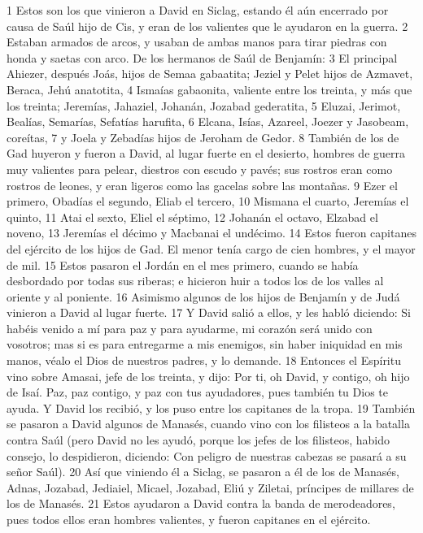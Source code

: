 1 Estos son los que vinieron a David en Siclag, estando él aún encerrado por causa de Saúl hijo de Cis, y eran de los valientes que le ayudaron en la guerra.
2 Estaban armados de arcos, y usaban de ambas manos para tirar piedras con honda y saetas con arco. De los hermanos de Saúl de Benjamín:
3 El principal Ahiezer, después Joás, hijos de Semaa gabaatita; Jeziel y Pelet hijos de Azmavet, Beraca, Jehú anatotita,
4 Ismaías gabaonita, valiente entre los treinta, y más que los treinta; Jeremías, Jahaziel, Johanán, Jozabad gederatita,
5 Eluzai, Jerimot, Bealías, Semarías, Sefatías harufita,
6 Elcana, Isías, Azareel, Joezer y Jasobeam, coreítas,
7 y Joela y Zebadías hijos de Jeroham de Gedor.
8 También de los de Gad huyeron y fueron a David, al lugar fuerte en el desierto, hombres de guerra muy valientes para pelear, diestros con escudo y pavés; sus rostros eran como rostros de leones, y eran ligeros como las gacelas sobre las montañas.
9 Ezer el primero, Obadías el segundo, Eliab el tercero,
10 Mismana el cuarto, Jeremías el quinto,
11 Atai el sexto, Eliel el séptimo,
12 Johanán el octavo, Elzabad el noveno,
13 Jeremías el décimo y Macbanai el undécimo.
14 Estos fueron capitanes del ejército de los hijos de Gad. El menor tenía cargo de cien hombres, y el mayor de mil.
15 Estos pasaron el Jordán en el mes primero, cuando se había desbordado por todas sus riberas; e hicieron huir a todos los de los valles al oriente y al poniente.
16 Asimismo algunos de los hijos de Benjamín y de Judá vinieron a David al lugar fuerte.
17 Y David salió a ellos, y les habló diciendo: Si habéis venido a mí para paz y para ayudarme, mi corazón será unido con vosotros; mas si es para entregarme a mis enemigos, sin haber iniquidad en mis manos, véalo el Dios de nuestros padres, y lo demande.
18 Entonces el Espíritu vino sobre Amasai, jefe de los treinta, y dijo: Por ti, oh David, y contigo, oh hijo de Isaí. Paz, paz contigo, y paz con tus ayudadores, pues también tu Dios te ayuda. Y David los recibió, y los puso entre los capitanes de la tropa.
19 También se pasaron a David algunos de Manasés, cuando vino con los filisteos a la batalla contra Saúl (pero David no les ayudó, porque los jefes de los filisteos, habido consejo, lo despidieron, diciendo: Con peligro de nuestras cabezas se pasará a su señor Saúl).
20 Así que viniendo él a Siclag, se pasaron a él de los de Manasés, Adnas, Jozabad, Jediaiel, Micael, Jozabad, Eliú y Ziletai, príncipes de millares de los de Manasés.
21 Estos ayudaron a David contra la banda de merodeadores, pues todos ellos eran hombres valientes, y fueron capitanes en el ejército.
